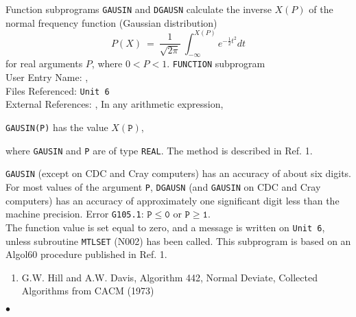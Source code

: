                
             
\Submitter{}                
                  
Function subprograms {\tt GAUSIN} and {\tt DGAUSN} calculate the inverse
$X(P)$ of the normal frequency function (Gaussian distribution)
$$ P(X) \ = \ \frac{1}{\sqrt{2\pi}} \
\int_{-\infty}^{X(P)}e^{-\frac{1}{2}t^2}dt $$
for real arguments $P$, where $0 < P < 1$.
\Structure
{\tt FUNCTION} subprogram \\
User Entry Name: ,  \\
Files Referenced: {\tt Unit 6} \\
External References: , 
\Usage
In any arithmetic expression,
\begin{center}
{\tt GAUSIN(P)} \quad has the value \quad $X(\mathtt{P})$,
\end{center}
where {\tt GAUSIN} and {\tt P} are of type {\tt REAL}.
\Method
The method is described in Ref. 1.
\Accuracy
 
\Accuracy
{\tt GAUSIN} (except on CDC and Cray computers)
has an accuracy of about six digits.
For most values of the argument {\tt P}, {\tt DGAUSN}
(and {\tt GAUSIN} on CDC and Cray computers) has an accuracy of
approximately one significant digit less than the machine precision.
\Errorh
Error {\tt G105.1}: $\mathtt{P \le 0}$ or $\mathtt{P \ge 1}$. \\
The function value is set equal to zero, and a message is written on
{\tt Unit 6}, unless subroutine {\tt MTLSET} (N002) has been called.
\Source
This subprogram is based on an Algol60 procedure published in Ref. 1.
\Refer
\begin{enumerate}
\item G.W. Hill and A.W. Davis, Algorithm 442, Normal Deviate,
Collected Algorithms from CACM (1973)
\end{enumerate}
$\bullet$
